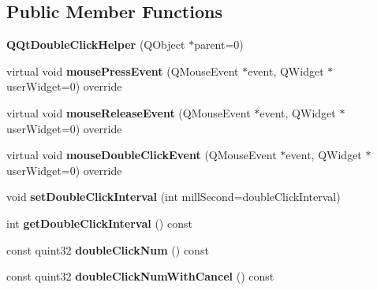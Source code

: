 \subsection*{Public Member Functions}
\begin{DoxyCompactItemize}
\item 
\mbox{\label{class_q_qt_double_click_helper_a4b6c5165eb9f5281977b1f5c078cf95a}} 
{\bfseries Q\+Qt\+Double\+Click\+Helper} (Q\+Object $\ast$parent=0)
\item 
\mbox{\label{class_q_qt_double_click_helper_a71f5418c7b5670f5ab1383b867afbb0e}} 
virtual void {\bfseries mouse\+Press\+Event} (Q\+Mouse\+Event $\ast$event, Q\+Widget $\ast$user\+Widget=0) override
\item 
\mbox{\label{class_q_qt_double_click_helper_af35e7a04d3609aacb0f1ba86ae373676}} 
virtual void {\bfseries mouse\+Release\+Event} (Q\+Mouse\+Event $\ast$event, Q\+Widget $\ast$user\+Widget=0) override
\item 
\mbox{\label{class_q_qt_double_click_helper_a549d190300075033028027081256e829}} 
virtual void {\bfseries mouse\+Double\+Click\+Event} (Q\+Mouse\+Event $\ast$event, Q\+Widget $\ast$user\+Widget=0) override
\item 
\mbox{\label{class_q_qt_double_click_helper_a5cac7e0d79fa80a9c2854739609fd59c}} 
void {\bfseries set\+Double\+Click\+Interval} (int mill\+Second=double\+Click\+Interval)
\item 
\mbox{\label{class_q_qt_double_click_helper_ac47e02089d14b70cac7c4001e6ca5f00}} 
int {\bfseries get\+Double\+Click\+Interval} () const
\item 
\mbox{\label{class_q_qt_double_click_helper_a755f823d1506112bc8e67384710200a8}} 
const quint32 {\bfseries double\+Click\+Num} () const
\item 
\mbox{\label{class_q_qt_double_click_helper_aa23450247c4cc6e3aec9ef028fc3f027}} 
const quint32 {\bfseries double\+Click\+Num\+With\+Cancel} () const
\end{DoxyCompactItemize}
